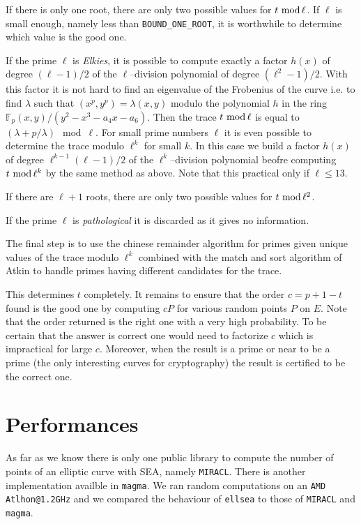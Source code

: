 \documentclass[11pt]{article}
\def\ellsea{\texttt{ellsea}\xspace}
\def\MIRACL{\texttt{MIRACL}\xspace}
\def\magma{\texttt{magma}\xspace}
\def \mymod#1{\mkern 6mu\text{mod}\,#1}
\begin{document}
If there is only one root, there are only two possible values for $t\mymod
\ell$. If $\ell$ is small enough, namely less than {\tt BOUND\_ONE\_ROOT}, it
is worthwhile to determine which value is the good one.

If the prime $\ell$ is \emph{Elkies}, it is possible to compute exactly a
factor $h(x)$ of degree $(\ell-1)/2$ of the $\ell$--division polynomial of
degree $(\ell^2-1)/2$. With this factor it is not hard to find an eigenvalue
of the Frobenius of the curve i.e. to find $\lambda$ such that $(x^p, y^p) =
\lambda (x,y)$ modulo the polynomial $h$ in the ring
$\mathbb{F}_p(x,y)/(y^2-x^3-a_4x-a_6).$ Then the trace $t\mymod \ell $ is
equal to $(\lambda + p/\lambda)\mod \ell$. For small prime numbers $\ell$ it
is even possible to determine the trace modulo $\ell^k$ for small $k$. In
this case we build a factor $h(x)$ of degree $\ell^{k-1}(\ell -1 )/2$ of the
$\ell^k$--division polynomial beofre computing $t\mymod  \ell^k$  by the
same method as above. Note that this practical  only if $\ell \leqslant 13$.

If there are $\ell + 1 $ roots, there are only two possible values for $t\mymod
\ell^2$.

If the prime $\ell$ is \emph{pathological} it is discarded as it gives no
information.

The final step is to use the chinese remainder algorithm for primes given
unique values of the trace modulo $\ell^k$ combined with the match and sort
algorithm of Atkin to handle primes having different candidates for the
trace.

This determines $t$ completely. It remains to ensure that the order $c =
p+1-t$ found is the good one by computing $cP$ for various random points $P$
on $E$. Note that the order returned is the right one with a very high
probability. To be certain that the answer is correct one  would need to
factorize $c$ which is impractical for large $c$. Moreover, when the result
is a prime or near to be a prime (the only interesting curves for
cryptography) the result is certified to be the correct one.

\section{Performances}\label{trois}
As far as we know there is only one public library to compute the number of
points of an elliptic curve with SEA, namely \MIRACL \cite{miracl}.
There is another implementation availble in \magma \cite{magma}. We ran
random computations on an {\tt AMD Atlhon@1.2GHz} and we compared the
behaviour of \ellsea to those of \MIRACL and \magma.
\end{document}
